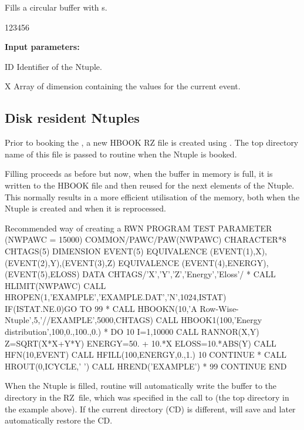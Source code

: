 
\Action
Fills a circular buffer with \RWN{}s.

\begin{DLttc}{123456}
\item[{\rm\bf Input parameters:}]
\item[ID] Identifier of the Ntuple.
\item[X] Array of dimension  containing
the values for the current event.
\end{DLttc}

\subsection*{Disk resident Ntuples}

Prior to booking the \RWN{}, a new HBOOK RZ file is created
using .
The top directory name of this file is passed
to routine  when the Ntuple is booked.

Filling proceeds as before but now, when the buffer in memory
is full, it is written to the HBOOK file and then reused
for the next elements of the Ntuple.
This normally results in a more efficient
utilisation of the memory,
both when the Ntuple is created and when it is reprocessed.

\begin{XMPt}{Recommended way of creating a RWN}
      PROGRAM TEST
      PARAMETER (NWPAWC = 15000)
      COMMON/PAWC/PAW(NWPAWC)
      CHARACTER*8 CHTAGS(5)
      DIMENSION EVENT(5)
      EQUIVALENCE (EVENT(1),X),(EVENT(2),Y),(EVENT(3),Z)
      EQUIVALENCE (EVENT(4),ENERGY),(EVENT(5),ELOSS)
      DATA CHTAGS/'X','Y','Z','Energy','Eloss'/
*
      CALL HLIMIT(NWPAWC)
      CALL HROPEN(1,'EXAMPLE','EXAMPLE.DAT','N',1024,ISTAT)
      IF(ISTAT.NE.0)GO TO 99
*
      CALL HBOOKN(10,'A Row-Wise-Ntuple',5,'//EXAMPLE',5000,CHTAGS)
      CALL HBOOK1(100,'Energy distribution',100,0.,100.,0.)
*
      DO 10 I=1,10000
         CALL RANNOR(X,Y)
         Z=SQRT(X*X+Y*Y)
         ENERGY=50. + 10.*X
         ELOSS=10.*ABS(Y)
         CALL HFN(10,EVENT)
         CALL HFILL(100,ENERGY,0.,1.)
 10   CONTINUE
*
      CALL HROUT(0,ICYCLE,' ')
      CALL HREND('EXAMPLE')
*
 99   CONTINUE
      END
\end{XMPt}

When the Ntuple is filled, routine  will automatically write
the buffer to the directory in the RZ~file, which was specified in the
call to  (the top directory  in the
example above).  If the current directory 
(CD) is different,
 will save and later automatically restore the CD.

